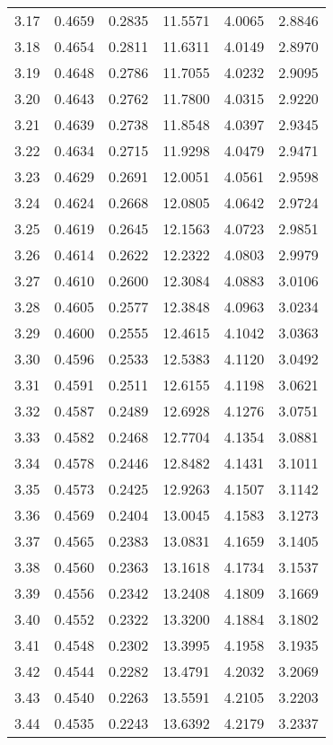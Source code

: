 \documentclass{article}
\begin{document}
\begin{longtable}{cccccc}
3.17 & 0.4659 & 0.2835 & 11.5571 & 4.0065 & 2.8846 \\
3.18 & 0.4654 & 0.2811 & 11.6311 & 4.0149 & 2.8970 \\
3.19 & 0.4648 & 0.2786 & 11.7055 & 4.0232 & 2.9095 \\
3.20 & 0.4643 & 0.2762 & 11.7800 & 4.0315 & 2.9220 \\
3.21 & 0.4639 & 0.2738 & 11.8548 & 4.0397 & 2.9345 \\
3.22 & 0.4634 & 0.2715 & 11.9298 & 4.0479 & 2.9471 \\
3.23 & 0.4629 & 0.2691 & 12.0051 & 4.0561 & 2.9598 \\
3.24 & 0.4624 & 0.2668 & 12.0805 & 4.0642 & 2.9724 \\
3.25 & 0.4619 & 0.2645 & 12.1563 & 4.0723 & 2.9851 \\
3.26 & 0.4614 & 0.2622 & 12.2322 & 4.0803 & 2.9979 \\
3.27 & 0.4610 & 0.2600 & 12.3084 & 4.0883 & 3.0106 \\
3.28 & 0.4605 & 0.2577 & 12.3848 & 4.0963 & 3.0234 \\
3.29 & 0.4600 & 0.2555 & 12.4615 & 4.1042 & 3.0363 \\
3.30 & 0.4596 & 0.2533 & 12.5383 & 4.1120 & 3.0492 \\
3.31 & 0.4591 & 0.2511 & 12.6155 & 4.1198 & 3.0621 \\
3.32 & 0.4587 & 0.2489 & 12.6928 & 4.1276 & 3.0751 \\
3.33 & 0.4582 & 0.2468 & 12.7704 & 4.1354 & 3.0881 \\
3.34 & 0.4578 & 0.2446 & 12.8482 & 4.1431 & 3.1011 \\
3.35 & 0.4573 & 0.2425 & 12.9263 & 4.1507 & 3.1142 \\
3.36 & 0.4569 & 0.2404 & 13.0045 & 4.1583 & 3.1273 \\
3.37 & 0.4565 & 0.2383 & 13.0831 & 4.1659 & 3.1405 \\
3.38 & 0.4560 & 0.2363 & 13.1618 & 4.1734 & 3.1537 \\
3.39 & 0.4556 & 0.2342 & 13.2408 & 4.1809 & 3.1669 \\
3.40 & 0.4552 & 0.2322 & 13.3200 & 4.1884 & 3.1802 \\
3.41 & 0.4548 & 0.2302 & 13.3995 & 4.1958 & 3.1935 \\
3.42 & 0.4544 & 0.2282 & 13.4791 & 4.2032 & 3.2069 \\
3.43 & 0.4540 & 0.2263 & 13.5591 & 4.2105 & 3.2203 \\
3.44 & 0.4535 & 0.2243 & 13.6392 & 4.2179 & 3.2337 \\

\end{longtable}
\end{document}
